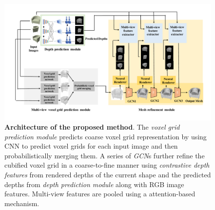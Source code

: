 \begin{figure}[t]
\begin{center}
\includegraphics[width=\linewidth]{imgs/meshrcnn_architecture.pdf}
\end{center}
\caption{
    \textbf{Architecture of the proposed method}.
    The \emph{voxel grid prediction module} predicts coarse voxel grid representation by using CNN to predict voxel grids for each input image and then probabilistically merging them.
    A series of \emph{GCN}s further refine the cubified voxel grid in a coarse-to-fine manner
    using \emph{contrastive depth features} from rendered depths of the current shape and the predicted depths from \emph{depth prediction module} along with RGB image features.
    Multi-view features are pooled using a attention-based mechanism.
}
\label{fig:system_architecture}
\end{figure}

